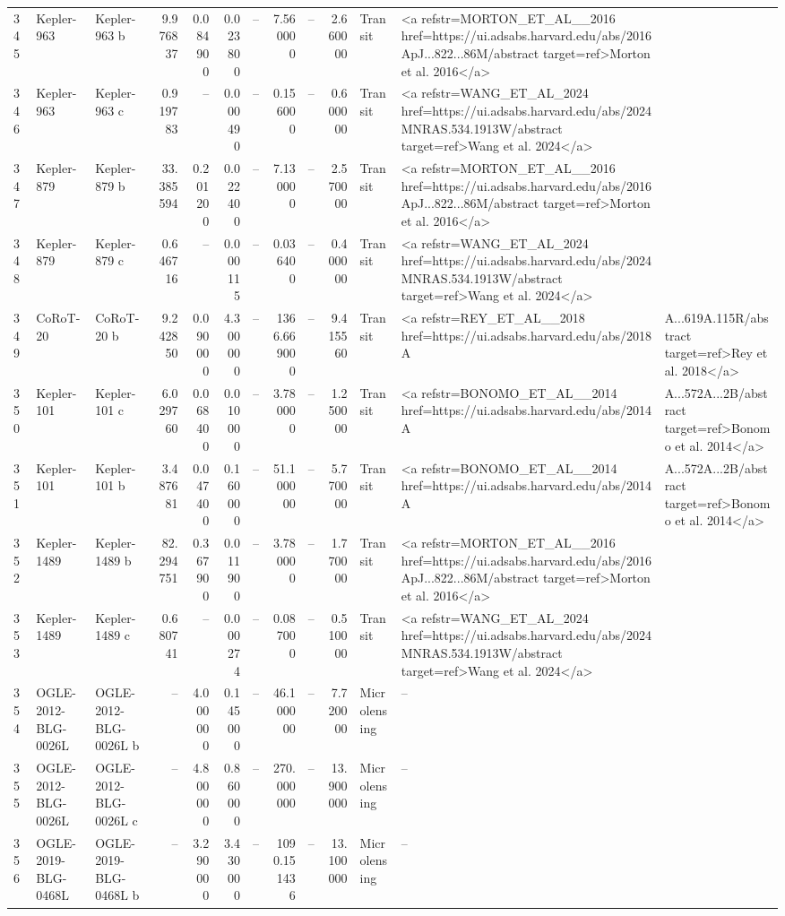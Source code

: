 \begin{tabular}{lllrrrrrrrll}
345 & Kepler-963 & Kepler-963 b & 9.976837 & 0.084900 & 0.023800 & -- & 7.560000 & -- & 2.660000 & Transit & <a refstr=MORTON_ET_AL__2016 href=https://ui.adsabs.harvard.edu/abs/2016ApJ...822...86M/abstract target=ref>Morton et al. 2016</a> \\
346 & Kepler-963 & Kepler-963 c & 0.919783 & -- & 0.000490 & -- & 0.156000 & -- & 0.600000 & Transit & <a refstr=WANG_ET_AL_2024 href=https://ui.adsabs.harvard.edu/abs/2024MNRAS.534.1913W/abstract target=ref>Wang et al. 2024</a> \\
347 & Kepler-879 & Kepler-879 b & 33.385594 & 0.201200 & 0.022400 & -- & 7.130000 & -- & 2.570000 & Transit & <a refstr=MORTON_ET_AL__2016 href=https://ui.adsabs.harvard.edu/abs/2016ApJ...822...86M/abstract target=ref>Morton et al. 2016</a> \\
348 & Kepler-879 & Kepler-879 c & 0.646716 & -- & 0.000115 & -- & 0.036400 & -- & 0.400000 & Transit & <a refstr=WANG_ET_AL_2024 href=https://ui.adsabs.harvard.edu/abs/2024MNRAS.534.1913W/abstract target=ref>Wang et al. 2024</a> \\
349 & CoRoT-20 & CoRoT-20 b & 9.242850 & 0.090000 & 4.300000 & -- & 1366.669000 & -- & 9.415560 & Transit & <a refstr=REY_ET_AL__2018 href=https://ui.adsabs.harvard.edu/abs/2018A&A...619A.115R/abstract target=ref>Rey et al. 2018</a> \\
350 & Kepler-101 & Kepler-101 c & 6.029760 & 0.068400 & 0.010000 & -- & 3.780000 & -- & 1.250000 & Transit & <a refstr=BONOMO_ET_AL__2014 href=https://ui.adsabs.harvard.edu/abs/2014A&A...572A...2B/abstract target=ref>Bonomo et al. 2014</a> \\
351 & Kepler-101 & Kepler-101 b & 3.487681 & 0.047400 & 0.160000 & -- & 51.100000 & -- & 5.770000 & Transit & <a refstr=BONOMO_ET_AL__2014 href=https://ui.adsabs.harvard.edu/abs/2014A&A...572A...2B/abstract target=ref>Bonomo et al. 2014</a> \\
352 & Kepler-1489 & Kepler-1489 b & 82.294751 & 0.367900 & 0.011900 & -- & 3.780000 & -- & 1.770000 & Transit & <a refstr=MORTON_ET_AL__2016 href=https://ui.adsabs.harvard.edu/abs/2016ApJ...822...86M/abstract target=ref>Morton et al. 2016</a> \\
353 & Kepler-1489 & Kepler-1489 c & 0.680741 & -- & 0.000274 & -- & 0.087000 & -- & 0.510000 & Transit & <a refstr=WANG_ET_AL_2024 href=https://ui.adsabs.harvard.edu/abs/2024MNRAS.534.1913W/abstract target=ref>Wang et al. 2024</a> \\
354 & OGLE-2012-BLG-0026L & OGLE-2012-BLG-0026L b & -- & 4.000000 & 0.145000 & -- & 46.100000 & -- & 7.720000 & Microlensing & -- \\
355 & OGLE-2012-BLG-0026L & OGLE-2012-BLG-0026L c & -- & 4.800000 & 0.860000 & -- & 270.000000 & -- & 13.900000 & Microlensing & -- \\
356 & OGLE-2019-BLG-0468L & OGLE-2019-BLG-0468L b & -- & 3.290000 & 3.430000 & -- & 1090.151436 & -- & 13.100000 & Microlensing & -- \\
\end{tabular}
